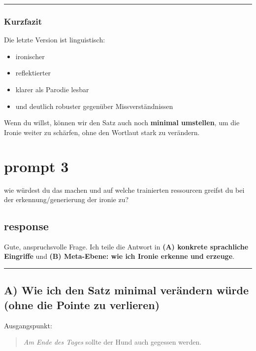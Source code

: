 \documentclass[
  letterpaper,
  DIV=11,
  numbers=noendperiod]{scrartcl}
\providecommand{\tightlist}{%
  \setlength{\itemsep}{0pt}\setlength{\parskip}{0pt}}
\begin{document}
\begin{center}\rule{0.5\linewidth}{0.5pt}\end{center}

\subsubsection{Kurzfazit}\label{kurzfazit}

Die letzte Version ist linguistisch:

\begin{itemize}
\tightlist
\item
  ironischer
\item
  reflektierter
\item
  klarer als Parodie lesbar
\item
  und deutlich robuster gegenüber Missverständnissen
\end{itemize}

Wenn du willst, können wir den Satz auch noch \textbf{minimal
umstellen}, um die Ironie weiter zu schärfen, ohne den Wortlaut stark zu
verändern.

\section{prompt 3}\label{prompt-3}

wie würdest du das machen und auf welche trainierten ressourcen greifst
du bei der erkennung/generierung der ironie zu?

\subsection{response}\label{response-2}

Gute, anspruchsvolle Frage. Ich teile die Antwort in \textbf{(A)
konkrete sprachliche Eingriffe} und \textbf{(B) Meta-Ebene: wie ich
Ironie erkenne und erzeuge}.

\begin{center}\rule{0.5\linewidth}{0.5pt}\end{center}

\subsection{A) Wie ich den Satz minimal verändern würde (ohne die Pointe
zu
verlieren)}\label{a-wie-ich-den-satz-minimal-veruxe4ndern-wuxfcrde-ohne-die-pointe-zu-verlieren}

Ausgangspunkt:

\begin{quote}
\emph{Am Ende des Tages} sollte der Hund auch gegessen werden.
\end{quote}
\end{document}
